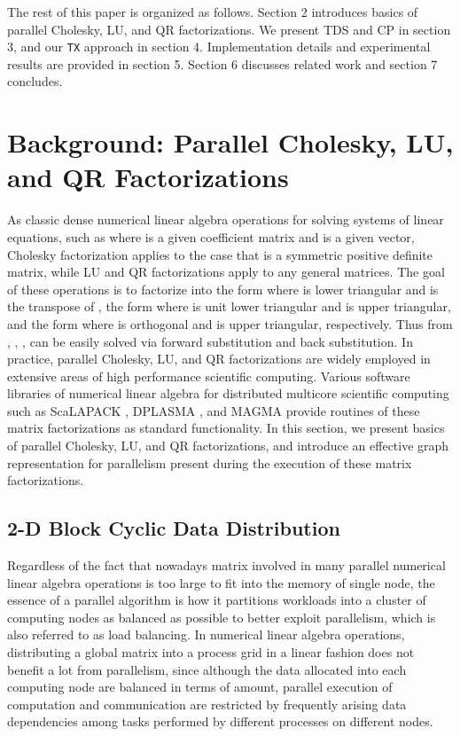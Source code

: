\documentclass[12pt]{elsarticle}
\begin{document}
The rest of this paper is organized as follows. Section 2 introduces basics of parallel Cholesky, LU, and QR factorizations. We present TDS and CP in section 3, and our \texttt{TX} approach in section 4. Implementation details and experimental results are provided in section 5. Section 6 discusses related work and section 7 concludes.


\section{Background: Parallel Cholesky, LU, and QR Factorizations}

As classic dense numerical linear algebra operations for solving systems of linear equations, such as  where  is a given coefficient matrix and  is a given vector, Cholesky factorization applies to the case that  is a symmetric positive definite matrix, while LU and QR factorizations apply to any general  matrices. The goal of these operations is to factorize  into the form  where  is lower triangular and  is the transpose of , the form  where  is unit lower triangular and  is upper triangular, and the form  where  is orthogonal and  is upper triangular, respectively. Thus from , , ,  can be easily solved via forward substitution and back substitution. In practice, parallel Cholesky, LU, and QR factorizations are widely employed in extensive areas of high performance scientific computing. Various software libraries of numerical linear algebra for distributed multicore scientific computing such as ScaLAPACK \cite{scalapack}, DPLASMA \cite{dplasma}, and MAGMA \cite{magma} provide routines of these matrix factorizations as standard functionality. In this section, we present basics of parallel Cholesky, LU, and QR factorizations, and introduce an effective graph representation for parallelism present during the execution of these matrix factorizations.

\subsection{2-D Block Cyclic Data Distribution}

Regardless of the fact that nowadays matrix involved in many parallel numerical linear algebra operations is too large to fit into the memory of single node, the essence of a parallel algorithm is how it partitions workloads into a cluster of computing nodes as balanced as possible to better exploit parallelism, which is also referred to as load balancing. In numerical linear algebra operations, distributing a global matrix into a process grid in a linear fashion does not benefit a lot from parallelism, since although the data allocated into each computing node are balanced in terms of amount, parallel execution of computation and communication are restricted by frequently arising data dependencies among tasks performed by different processes on different nodes.
\end{document}
